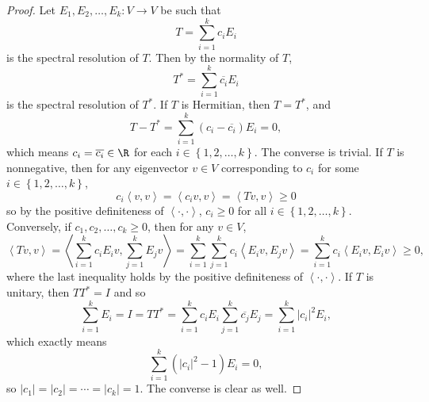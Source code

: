 \documentclass[linearalgebraII]{subfiles}
\begin{document}
    \begin{proof}
        Let $E_1,E_2,\ldots,E_k:V\to V$ be such that
        \begin{equation*}
            T = \sum^{k}_{i=1} c_iE_i
        \end{equation*}
        is the spectral resolution of $T$. Then by the normality of $T$,
        \begin{equation*}
            T^* = \sum^{k}_{i=1} \overline{c_i} E_i
        \end{equation*}
        is the spectral resolution of $T^*$. If $T$ is Hermitian, then $T = T^*$, and
        \begin{equation*}
            T - T^* = \sum^{k}_{i=1} \left( c_i - \overline{c_i}  \right) E_i = 0,
        \end{equation*}
        which means $c_i = \overline{c_i} \in\R$ for each $i\in\left\lbrace 1,2,\ldots,k \right\rbrace$. The converse is trivial. If $T$ is nonnegative, then for any eigenvector $v\in V$ corresponding to $c_i$ for some $i\in\left\lbrace 1,2,\ldots,k \right\rbrace$,
        \begin{equation*}
            c_i\left\langle v, v\right\rangle = \left\langle c_iv, v\right\rangle = \left\langle Tv, v\right\rangle \geq 0
        \end{equation*}
        so by the positive definiteness of $\left\langle \cdot, \cdot\right\rangle$, $c_i\geq 0$ for all $i\in\left\lbrace 1,2,\ldots,k \right\rbrace $. Conversely, if $c_1,c_2,\ldots,c_k\geq 0$, then for any $v\in V$,
        \begin{equation*}
            \left\langle Tv, v\right\rangle = \left\langle \sum^{k}_{i=1} c_iE_iv, \sum^{k}_{j=1} E_jv\right\rangle = \sum^{k}_{i=1} \sum^{k}_{j=1} c_i\left\langle E_iv, E_jv\right\rangle = \sum^{k}_{i=1} c_i \left\langle E_iv, E_iv\right\rangle \geq 0,
        \end{equation*}
        where the last inequality holds by the positive definiteness of $\left\langle \cdot, \cdot\right\rangle$. If $T$ is unitary, then $TT^* = I$ and so
        \begin{equation*}
            \sum^{k}_{i=1} E_i = I = TT^* = \sum^{k}_{i=1} c_iE_i\sum^{k}_{j=1} \overline{c_j} E_j = \sum^{k}_{i=1} \left| c_i \right| ^2E_i,
        \end{equation*}
        which exactly means
        \begin{equation*}
            \sum^{k}_{i=1} \left( \left| c_i \right| ^2-1 \right) E_i = 0,
        \end{equation*}
        so $\left| c_1 \right| = \left| c_2 \right| = \cdots = \left| c_k \right| = 1$. The converse is clear as well.
    \end{proof}
\end{document}
